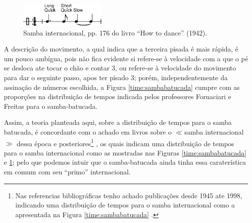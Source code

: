 \begin{itemize}
\parbox[t]{\dimexpr\textwidth-\leftmargin}{%
\begin{figure}
  \vspace{-10pt}
  \includegraphics[width=0.38\textwidth]{chapters/cap-historia-sambagafieira/samba-internacional-timming.eps}
  \caption{Samba internacional, pp. 176 do livro ``How to dance'' (1942).}
  \vspace{-10pt}
  \label{timming:samba-internacional:a}
\end{figure}
A descrição do movimento, a qual indica que a terceira pisada é mais rápida,
é um pouco ambígua, 
pois não fica evidente si refere-se à velocidade com a que o pé se desloca ate tocar o chão e contar 3,
ou refere-se à velocidade do movimento para dar o seguinte passo, apos ter pisado 3;
porém, 
independentemente da assinação de números escolhida, 
a Figura \ref{time:sambabatucada} cumpre com as proporções na distribuição de tempos 
indicada pelos professores Fornaciari e Freitas para o samba-batucada.
}
Assim, a teoria planteada aqui, sobre a distribuição de tempos para o samba batucada, 
é concordante com o achado em livros sobre o $\ll$samba internacional$\gg$  
dessa época e posteriores\footnote{Nas referencias bibliográficas tenho achado publicações desde 1945 ate 1998,
indicando uma distribuição de tempos para o samba internacional como a apresentada na Figura \ref{time:sambabatucada}
\cite[pp. 7,176]{wright1945dance} \cite[pp. 193]{white1953dancing} \cite[pp. 69]{stephenson1992complete} \cite[pp. 125]{harris1998social}.}
\cite[pp. 7,176]{wright1945dance} \cite[pp. 193]{white1953dancing} \cite[pp. 69]{stephenson1992complete} \cite[pp. 125]{harris1998social},
os quais indicam uma distribuição de tempos para o samba internacional como as mostradas nas Figuras \ref{time:sambabatucada} e \ref{timming:samba-internacional:a};
pelo que podemos intuir que o samba-batucada ainda tinha essa caraterística em comum com seu ``primo'' internacional.

\end{itemize}
